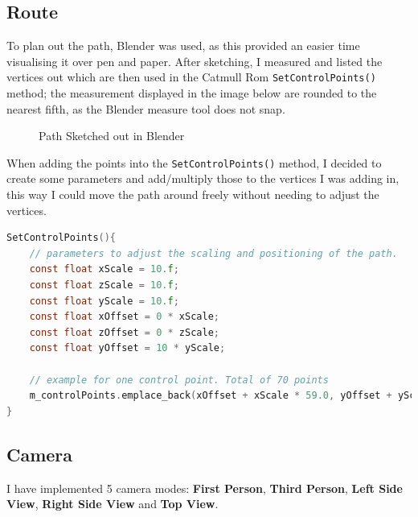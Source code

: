 \documentclass[10pt]{report}
\begin{document}
\subsection*{Route}
To plan out the path, Blender was used, as this provided an easier time visualising it over pen and paper. After sketching, I measured and listed the vertices out which are then used in the Catmull Rom \colorbox{mygrey}{\lstinline{SetControlPoints()}} method; the measurement displayed in the image below are rounded to the nearest fifth, as the Blender measure tool does not snap. 
\begin{figure}[H]
    \centering
    \caption{Path Sketched out in Blender}
\end{figure}

When adding the points into the \colorbox{mygrey}{\lstinline{SetControlPoints()}} method, I decided to create some parameters and add/multiply those to the vertices I was adding in, this way I could move the path around freely without needing to adjust the vertices.

\begin{lstlisting}[language=c]
SetControlPoints(){
    // parameters to adjust the scaling and positioning of the path.
    const float xScale = 10.f;
    const float zScale = 10.f;
    const float yScale = 10.f;
    const float xOffset = 0 * xScale;
    const float zOffset = 0 * zScale;
    const float yOffset = 10 * yScale;

    // example for one control point. Total of 70 points
    m_controlPoints.emplace_back(xOffset + xScale * 59.0, yOffset + yScale * 5.0, zOffset + zScale * 7.0);
}
\end{lstlisting}

\subsection*{Camera}
I have implemented 5 camera modes: \textbf{First Person}, \textbf{Third Person}, \textbf{Left Side View}, \textbf{Right Side View} and \textbf{Top View}.
\end{document}

